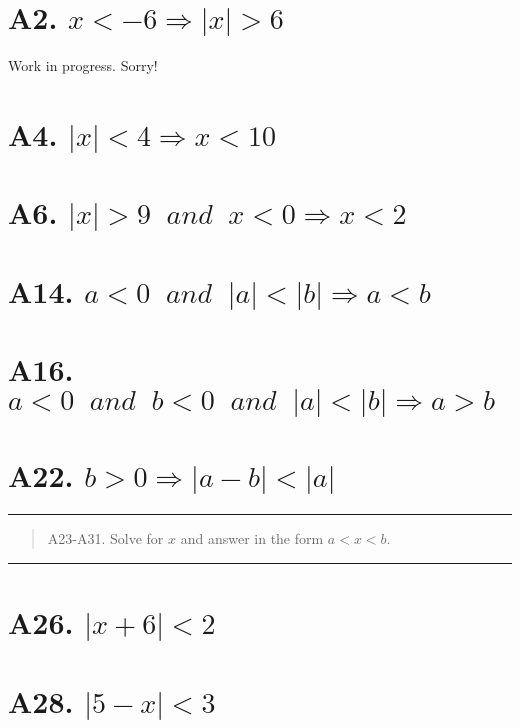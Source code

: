 
\section*{A2. $x < -6 \Rightarrow |x| > 6$}

Work in progress. Sorry!

\section*{A4. $|x| < 4 \Rightarrow x < 10$}

\section*{A6. $|x| > 9 \;\; and \;\; x < 0 \Rightarrow x < 2$}

\section*{A14. $a < 0 \;\; and \;\; |a| < |b| \Rightarrow a < b$}

\section*{A16. $a < 0 \;\; and \;\; b<0 \;\; and \;\; |a|<|b| \Rightarrow a > b$}

\section*{A22. $b>0 \Rightarrow |a-b| < |a|$}

\bgroup
\color{abs}
\hrule
\egroup

\begin{abstract}
	A23-A31. Solve for $x$ and answer in the form $a<x<b$.

	\noindent\textbf{}
	
\end{abstract}

\bgroup
\color{abs}
\hrule
\egroup

\section*{A26. $|x+6| < 2$}

\section*{A28. $|5-x| < 3$}

